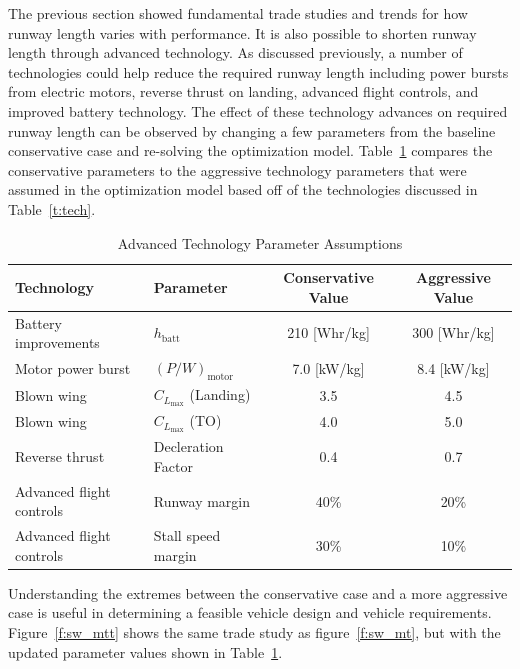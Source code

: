 \documentclass[]{aiaa-tc}%
\begin{document}
The previous section showed fundamental trade studies and trends for how runway length varies with performance.  
It is also possible to shorten runway length through advanced technology. 
As discussed previously, a number of technologies could help reduce the required runway length including power bursts from electric motors, reverse thrust on landing, advanced flight controls, and improved battery technology.  
The effect of these technology advances on required runway length can be observed by changing a few parameters from the baseline conservative case and re-solving the optimization model.
Table~\ref{t:techparams} compares the conservative parameters to the aggressive technology parameters that were assumed in the optimization model based off of the technologies discussed in Table~\ref{t:tech}. 

\begin{table}[H]
    \centering
    \caption{Advanced Technology Parameter Assumptions}
    \label{t:techparams}
    \begin{tabular}{l l c c}
    \toprule
    \toprule
    Technology                  & Parameter                         & Conservative Value  & Aggressive Value \\ \hline
    Battery improvements        & $h_{\mathrm{batt}}$               & 210 [Whr/kg]        & 300 [Whr/kg]\cite{batterytrend}\cite{seeo}     \\
    Motor power burst           & $(P/W)_{\mathrm{motor}}$          & 7.0 [kW/kg]       & 8.4 [kW/kg]     \\
    Blown wing                  & $C_{L_{\mathrm{max}}}$ (Landing)  & 3.5                 & 4.5              \\
    Blown wing                  & $C_{L_{\mathrm{max}}}$ (TO)       & 4.0                 & 5.0              \\
    Reverse thrust              & Decleration Factor                & 0.4                 & 0.7              \\
    Advanced flight controls    & Runway margin                     & 40\%                & 20\%             \\
    Advanced flight controls    & Stall speed margin                & 30\%                & 10\%             \\
    \bottomrule
\end{tabular}
\end{table}

Understanding the extremes between the conservative case and a more aggressive case is useful in determining a feasible vehicle design and vehicle requirements. 
Figure~\ref{f:sw_mtt} shows the same trade study as figure~\ref{f:sw_mt}, but with the updated parameter values shown in Table~\ref{t:techparams}.
\end{document}
